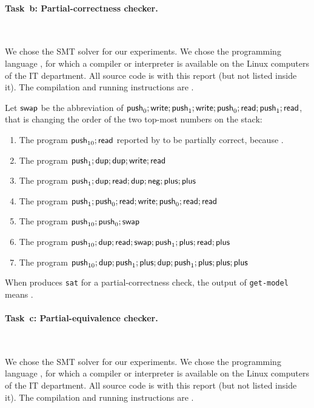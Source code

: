 \paragraph{Task~b: Partial-correctness checker.}~
%

We chose the SMT solver \SolverSMT for our experiments.
%
We chose the programming language \todo{\filler}, for which a compiler
or interpreter is available on the Linux computers of the IT
department.  All source code is  with this report (but
not listed inside it).  The compilation and running instructions are
\todo{\filler}.

Let $\mathsf{swap}$ be the abbreviation of
$\mathsf{push}_{0}; \mathsf{write}; \mathsf{push}_{1}; \mathsf{write}; \mathsf{push}_{0}; \mathsf{read}; \mathsf{push}_{1};
\mathsf{read}$, that is changing the order of the two top-most numbers on the
stack:
\begin{enumerate}
\item The program $\mathsf{push}_{10}; \mathsf{read}$  reported by
  \SolverSMT to be partially correct, because \todo{\filler}.
\item The program $\mathsf{push}_{1}; \mathsf{dup}; \mathsf{dup}; \mathsf{write}; \mathsf{read}$ \todo{\filler}
\item The program $\mathsf{push}_{1}; \mathsf{dup}; \mathsf{read}; \mathsf{dup}; \mathsf{neg}; \mathsf{plus}; \mathsf{plus}$
  \todo{\filler}
\item The program
  $\mathsf{push}_{1}; \mathsf{push}_{0}; \mathsf{read}; \mathsf{write}; \mathsf{push}_{0}; \mathsf{read}; \mathsf{read}$
  \todo{\filler}
\item The program $\mathsf{push}_{10}; \mathsf{push}_{0}; \mathsf{swap}$ \todo{\filler}
\item The program
  $\mathsf{push}_{10}; \mathsf{dup}; \mathsf{read}; \mathsf{swap}; \mathsf{push}_{1}; \mathsf{plus}; \mathsf{read}; \mathsf{plus}$
  \todo{\filler}
\item The program
  $\mathsf{push}_{10}; \mathsf{dup}; \mathsf{push}_{1}; \mathsf{plus}; \mathsf{dup}; \mathsf{push}_{1}; \mathsf{plus}; \mathsf{plus};
  \mathsf{plus}$ \todo{\filler}
\end{enumerate}
When \SolverSMT produces \texttt{sat} for a partial-correctness check,
the output of \texttt{get-model} means \todo{\filler}.

\paragraph{Task~c: Partial-equivalence checker.}~
%

We chose the SMT solver \SolverSMT for our experiments.
%
We chose the programming language \todo{\filler}, for which a compiler
or interpreter is available on the Linux computers of the IT
department.  All source code is  with this report (but
not listed inside it).  The compilation and running instructions are
\todo{\filler}.

